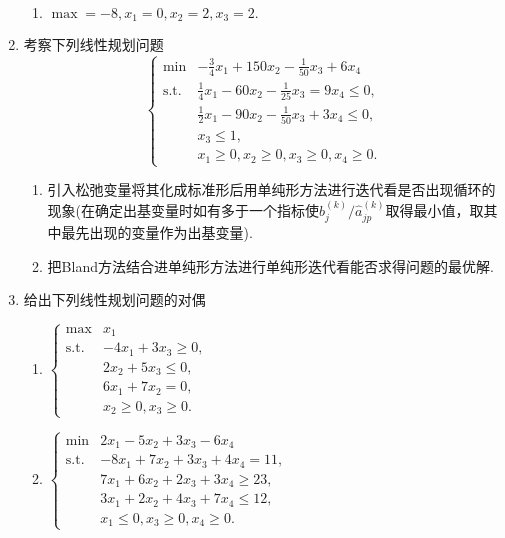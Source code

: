 \begin{enumerate}
\begin{enumerate}[label=(\arabic*)]
        \item $\displaystyle\max=-8,x_1=0,x_2=2,x_3=2.$
    \end{enumerate}
    \item 考察下列线性规划问题
    \[\begin{cases}
        \min & \displaystyle-\frac{3}{4}x_1+150x_2-\frac{1}{50}x_3+6x_4\\
        \text{s.t.} & \displaystyle\frac{1}{4}x_1-60x_2-\frac{1}{25}x_3 = 9x_4 \leqslant 0,\\
        & \displaystyle\frac{1}{2}x_1-90x_2-\frac{1}{50}x_3+3x_4 \leqslant 0,\\
        & x_3 \leqslant 1,\\
        & x_1 \geqslant 0, x_2 \geqslant 0, x_3 \geqslant 0, x_4 \geqslant 0.
    \end{cases}\]
    \begin{enumerate}[label=(\arabic*)]
        \item 引入松弛变量将其化成标准形后用单纯形方法进行迭代看是否出现循环的现象(在确定出基变量时如有多于一个指标使$b_j^{(k)}/\hat{a}_{jp}^{(k)}$取得最小值，取其中最先出现的变量作为出基变量).
        \item 把Bland方法结合进单纯形方法进行单纯形迭代看能否求得问题的最优解.
    \end{enumerate}
    \omitted
    \item 给出下列线性规划问题的对偶
    \begin{enumerate}[label=(\arabic*)]
        \item $\begin{cases}
            \max & x_1\\
            \text{s.t.} & -4x_1+3x_3 \geqslant 0,\\
            & 2x_2+5x_3 \leqslant 0,\\
            & 6x_1+7x_2=0,\\
            & x_2 \geqslant 0, x_3 \geqslant 0.
        \end{cases}$
        \item $\begin{cases}
            \min & 2x_1-5x_2+3x_3-6x_4\\
            \text{s.t.} & -8x_1+7x_2+3x_3+4x_4 = 11,\\
            & 7x_1+6x_2+2x_3+3x_4 \geqslant 23,\\
            & 3x_1+2x_2+4x_3+7x_4 \leqslant 12,\\
            & x_1 \leqslant 0, x_3 \geqslant 0, x_4 \geqslant 0.
        \end{cases}$

\end{enumerate}
\end{enumerate}
